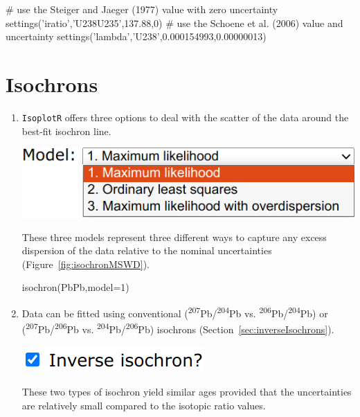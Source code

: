 \begin{refsection}
\begin{script}
# use the Steiger and Jaeger (1977) value with zero uncertainty
settings('iratio','U238U235',137.88,0)
# use the Schoene et al. (2006) value and uncertainty
settings('lambda','U238',0.000154993,0.00000013) 
\end{script}

\section{Isochrons}

\begin{enumerate}

\item \texttt{IsoplotR} offers three options to deal with the scatter of the
  data around the best-fit isochron line.

\noindent\begin{minipage}[t]{.45\linewidth}
\strut\vspace*{-\baselineskip}\newline
\includegraphics[width=\linewidth]{../figures/PbPbIsochronModels.png}
\end{minipage}
\begin{minipage}[t]{.55\linewidth}
  These three models represent three different ways to capture any
  excess dispersion of the data relative to the nominal uncertainties
  (Figure~\ref{fig:isochronMSWD}).
\end{minipage}

\begin{console}
isochron(PbPb,model=1)
\end{console}

\item Data can be fitted using conventional
  (\textsuperscript{207}Pb/\textsuperscript{204}Pb
  vs. \textsuperscript{206}Pb/\textsuperscript{204}Pb) or
  (\textsuperscript{207}Pb/\textsuperscript{206}Pb
  vs. \textsuperscript{204}Pb/\textsuperscript{206}Pb) isochrons
  (Section~\ref{sec:inverseIsochrons}).

  \noindent\begin{minipage}[t]{.22\linewidth}
\strut\vspace*{-\baselineskip}\newline
\includegraphics[width=\linewidth]{../figures/PbPbisochronInverse.png}
\end{minipage}
\begin{minipage}[t]{.78\linewidth}
  These two types of isochron yield similar ages provided that the
  uncertainties are relatively small compared to the isotopic ratio
  values.
\end{minipage}


\end{enumerate}
\end{refsection}

